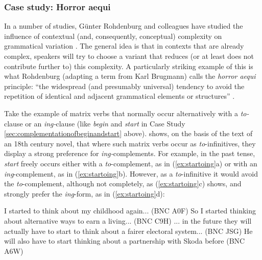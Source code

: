 \subsubsection{Case study: Horror aequi}
\label{sec:horroraequi}

In a number of studies, G\"{u}nter Rohdenburg and colleagues have studied the influence of contextual (and, consequently, conceptual) complexity  on grammatical  variation  \citep[e.g.][]{rohdenburg_replacement_1995, rohdenburg_cognitive_2003}. The general idea is that in contexts that are already complex, speakers will try to choose a variant that reduces (or at least does not contribute further to) this complexity.  A particularly striking example of this is what Rohdenburg (adapting a term from Karl Brugmann) calls the \textit{horror aequi}  principle: ``the widespread (and presumably universal) tendency to avoid the repetition of identical and adjacent grammatical  elements or structures'' \citep[206]{rohdenburg_cognitive_2003}.

Take the example of matrix verbs  that normally occur alternatively with a \textit{to-}clause or an \textit{ing-}clause (like \textit{begin} and \textit{start} in Case Study \ref{sec:complementationofbeginandstart} above). \citet[380]{rohdenburg_replacement_1995} shows, on the basis of the text of an 18th century novel,  that where such matrix verbs occur as \textit{to}-infinitives, they display a strong preference for \textit{ing-}complements.  For example, in the past tense, \textit{start} freely occurs either with a \textit{to}-complement, as in (\ref{ex:startoing}a) or with an \textit{ing}-complement, as in (\ref{ex:startoing}b). However, as a \textit{to}-infinitive it would avoid the \textit{to}-complement, although not completely, as (\ref{ex:startoing}c) shows, and strongly prefer the \textit{ing}-form, as in (\ref{ex:startoing}d):

\begin{exe}
\ex
\begin{xlist}
\label{ex:startoing}
\ex I started to think about my childhood again... (BNC A0F)
\ex So I started thinking about alternative ways to earn a living... (BNC C9H)
\ex ... in the future they will actually have to start to think about a fairer electoral system... (BNC JSG)
\ex He will also have to start thinking about a partnership with Skoda before (BNC A6W)
\end{xlist}
\end{exe}

